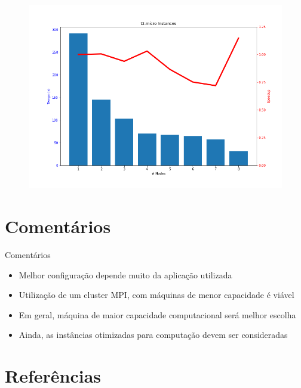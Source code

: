\documentclass{beamer}
\begin{document}
\begin{frame}
	\begin{figure}[ht]
		\begin{center}
 	 	  \includegraphics[scale=0.4]{figuras/t2microTime.png}	
		  \label{fig:fluxogramaAG}		
		\end{center}
	\end{figure}
\end{frame}


\section{Comentários}

\begin{frame}{Comentários}
	\begin{itemize}
		\item Melhor configuração depende muito da aplicação utilizada
		\item Utilização de um cluster MPI, com máquinas de menor capacidade é viável
		\item Em geral, máquina de maior capacidade computacional será melhor escolha
		\item Ainda, as instâncias otimizadas para computação devem ser consideradas
	\end{itemize}
\end{frame}


\section{Refer\^encias}

\appendix
\end{document}
